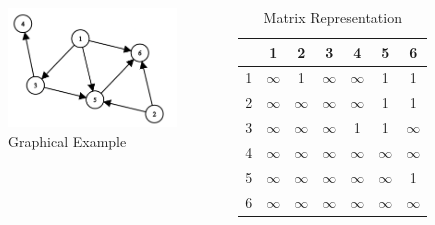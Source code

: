 \documentclass[a4paper]{beamer}
\begin{document}
\begin{frame}
	\begin{columns}
	\begin{figure}
		\includegraphics[scale=0.5]{./pict/exampleGraph.png}
		\caption{Graphical Example}
	\end{figure}

	\begin{table}
		\begin{tabular}{c|c|c|c|c|c|c}
			  & 1 & 2 & 3 & 4 & 5 & 6\\
			  \hline
			1 & $\infty$ & 1 & $\infty$ & $\infty$ & 1 & 1\\
			\hline
			2 & $\infty$ & $\infty$ & $\infty$ & $\infty$ & 1 & 1\\ 
			\hline
			3 & $\infty$ & $\infty$ & $\infty$ & 1 & 1 & $\infty$ \\
			\hline
			4 & $\infty$ & $\infty$ & $\infty$ & $\infty$ & $\infty$ & $\infty$  \\
			\hline
			5 &  $\infty$ & $\infty$ & $\infty$ & $\infty$ & $\infty$ & 1\\
			\hline
			6 & $\infty$ & $\infty$ & $\infty$ & $\infty$ & $\infty$ & $\infty$\\
			\hline
		\end{tabular}
		\caption{Matrix Representation}
	\end{table}
	\end{columns}
\end{frame}
\end{document}
